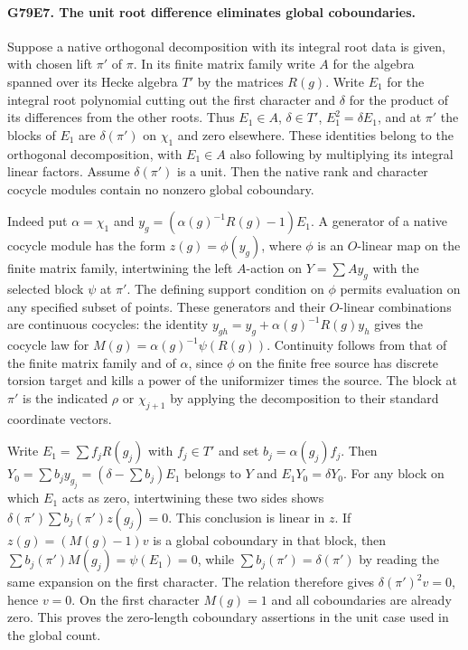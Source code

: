 \paragraph{G79E7. The unit root difference eliminates global coboundaries.}
Suppose a native orthogonal decomposition with its integral root
data is given, with chosen lift $\pi'$ of $\pi$. In its finite
matrix family write $A$ for the algebra spanned over its Hecke
algebra $T'$ by the matrices $R(g)$. Write $E_1$ for the integral
root polynomial cutting out the first character and $\delta$ for the
product of its differences from the other roots. Thus $E_1\in A$,
$\delta\in T'$, $E_1^2=\delta E_1$, and at $\pi'$ the blocks of
$E_1$ are $\delta(\pi')$ on $\chi_1$ and zero elsewhere.
These identities belong to the orthogonal decomposition, with
$E_1\in A$ also following by multiplying its integral linear factors.
Assume $\delta(\pi')$ is a unit. Then the native rank and character
cocycle modules contain no nonzero global coboundary.

Indeed put $\alpha=\chi_1$ and
$y_g=(\alpha(g)^{-1}R(g)-1)E_1$. A generator of a native cocycle
module has the form $z(g)=\phi(y_g)$, where $\phi$ is an $O$-linear
map on the finite matrix family, intertwining the left $A$-action
on $Y=\sum A y_g$ with the selected block $\psi$ at $\pi'$.
The defining support condition on $\phi$ permits evaluation on any
specified subset of points. These generators and their $O$-linear
combinations are continuous cocycles: the identity
$y_{gh}=y_g+\alpha(g)^{-1}R(g)y_h$ gives the cocycle law for
$M(g)=\alpha(g)^{-1}\psi(R(g))$. Continuity follows from that of
the finite matrix family and of $\alpha$, since $\phi$ on the finite
free source has discrete torsion target and kills a power of the
uniformizer times the source. The block at $\pi'$ is the indicated
$\rho$ or $\chi_{j+1}$ by applying the decomposition to their standard
coordinate vectors.

Write $E_1=\sum f_j R(g_j)$ with $f_j\in T'$ and set
$b_j=\alpha(g_j)f_j$. Then
$Y_0=\sum b_j y_{g_j}=(\delta-\sum b_j)E_1$ belongs to $Y$ and
$E_1Y_0=\delta Y_0$. For any block on which $E_1$ acts as zero,
intertwining these two sides shows
$\delta(\pi')\sum b_j(\pi') z(g_j)=0$. This conclusion is linear
in $z$. If $z(g)=(M(g)-1)v$ is a global coboundary in that block,
then $\sum b_j(\pi')M(g_j)=\psi(E_1)=0$, while
$\sum b_j(\pi')=\delta(\pi')$ by reading the same expansion
on the first character. The relation therefore gives
$\delta(\pi')^2 v=0$, hence $v=0$. On the first character
$M(g)=1$ and all coboundaries are already zero. This proves the
zero-length coboundary assertions in the unit case used in the global count.

